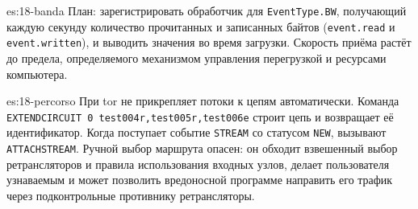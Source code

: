 \begin{soluzione}{es:18-banda}
План: зарегистрировать обработчик для \texttt{EventType.BW}, получающий каждую секунду количество прочитанных и записанных байтов (\texttt{event.read} и \texttt{event.written}), и выводить значения во время загрузки. Скорость приёма растёт до предела, определяемого механизмом управления перегрузкой и ресурсами компьютера.
\end{soluzione}

\begin{soluzione}{es:18-percorso}
При  tor не прикрепляет потоки к цепям автоматически. Команда \texttt{EXTENDCIRCUIT 0 test004r,test005r,test006e} строит цепь и возвращает её идентификатор. Когда поступает событие \texttt{STREAM} со статусом \texttt{NEW}, вызывают \texttt{ATTACHSTREAM}. Ручной выбор маршрута опасен: он обходит взвешенный выбор ретрансляторов и правила использования входных узлов, делает пользователя узнаваемым и может позволить вредоносной программе направить его трафик через подконтрольные противнику ретрансляторы.
\end{soluzione}
